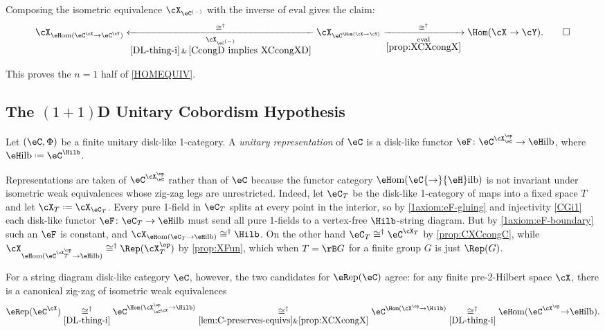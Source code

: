 \documentclass[12pt,reqno]{amsart}
\newcommand{\eRep}{{\eR}\mathrm{ep}}
\newcommand{\eFun}{{\eH}\mathrm{om}}
\newcommand{\eHilb}{{\eH}\mathrm{ilb}}
\newcommand{\eval}{\mathrm{eval}}
\newcommand{\psn}{\Phi}
\newcommand{\C}{\eC}
\newcommand{\defn}[1]{\emph{#1}}
\DeclareRobustCommand{\coloneq}{\mathrel{\vcenter{\baselineskip0.5ex\lineskiplimit0pt\hbox{\scriptsize{\upshape.}}\hbox{\scriptsize{\upshape.}}}}=}
\begin{document}
\begin{pf}
Composing the isometric equivalence $\cX_{\eC^{(-)}}$ with the inverse of $\eval$ gives the claim:
    \[
    \cX_{\eFun(\eC^\cX\to\eC^\cY)}
    \xleftarrow[\substack{\cX_{\eC^{(-)}}\\\eqref{DL-thing-i}\,\&\,\eqref{CcongD implies XCcongXD}}]{\cong^\dag}\cX_{\eC^{\Hom(\cX\to\cY)}}
    \xrightarrow[\substack{\eval\\\eqref{prop:XCXcongX}}]{\cong^\dag}
    \Hom(\cX\to\cY).\qedhere
    \]
\end{pf}

This proves the $n=1$ half of \cref{HOMEQUIV}.






\subsection{The \texorpdfstring{$(1+1)$D}{(1+1)D} Unitary Cobordism Hypothesis}
Let $(\eC,\psn)$ be a finite unitary disk-like 1-category. A \defn{unitary representation} of $\eC$ is a disk-like functor $\eF\colon\eC^{\cX_\C^\op}\to\eHilb$, where $\eHilb\coloneq\eC^\Hilb$. 


\begin{remark}
\label{rem:eRep-strings}
Representations are taken of $\eC^{\cX_\eC^\op}$ rather than of $\eC$ because the functor category $\eFun(\eC{\to}\eHilb)$ is not invariant under isometric weak equivalences whose zig-zag legs are unrestricted. Indeed, let $\eC_T$ be the disk-like 1-category of maps into a fixed space $T$ and let $\cX_T\coloneq\cX_{\C_T}$. Every pure 1-field in $\C_T$ splits at every point in the interior, so by \ref{1axiom:eF-gluing} and injectivity \ref{CGi1} each disk-like functor $\eF\colon\eC_T\to\eHilb$ must send all pure 1-fields to a vertex-free $\Hilb$-string diagram. But by \ref{1axiom:eF-boundary} such an $\eF$ is constant, and $\cX_{\eFun(\eC_T{\to}\eHilb)}\cong^\dag\Hilb$. On the other hand $\eC_T\cong^\dag\eC^{\cX_T}$ by \cref{prop:CXCcongC}, while $\cX_{\eFun(\eC^{\cX_T^\op}{\to}\eHilb)}\cong^\dag\Rep(\cX_T^\op)$ by \cref{prop:XFun}, which when $T=\rB G$ for a finite group $G$ is just $\Rep(G)$. 

For a string diagram disk-like category $\C$, however, the two candidates for $\eRep(\C)$ agree: for any finite pre-2-Hilbert space $\cX$, there is a canonical zig-zag of isometric weak equivalences
\[
\eRep(\eC^\cX)
\underset{\eqref{DL-thing-i}}{\cong^\dag}
\eC^{\Hom(\cX_{\eC^\cX}^\op\to\Hilb)}
\underset{\eqref{lem:C-preserves-equivs}\&\eqref{prop:XCXcongX}}{\cong^\dag}
\eC^{\Hom(\cX^\op\to\Hilb)}
\underset{\eqref{DL-thing-i}}{\cong^\dag}
\eFun(\eC^{\cX^\op}{\to}\eHilb).
\]
\end{remark}
\end{document}
